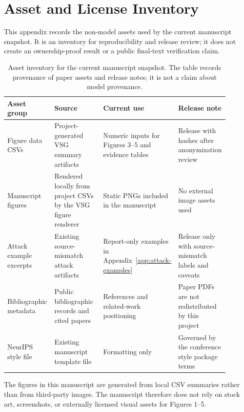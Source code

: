\section{Asset and License Inventory}
\label{app:asset-licenses}

This appendix records the non-model assets used by the current manuscript
snapshot.  It is an inventory for reproducibility and release review; it does
not create an ownership-proof result or a public final-text verification
claim.

\begin{table}[t]
\centering
\scriptsize
\setlength{\tabcolsep}{3pt}
\renewcommand{\arraystretch}{1.12}
\begin{tabular}{p{0.22\linewidth}p{0.27\linewidth}p{0.20\linewidth}p{0.21\linewidth}}
\toprule
Asset group & Source & Current use & Release note \\
\midrule
Figure data CSVs & Project-generated VSG summary artifacts & Numeric inputs for Figures 3--5 and evidence tables & Release with hashes after anonymization review \\
Manuscript figures & Rendered locally from project CSVs by the VSG figure renderer & Static PNGs included in the manuscript & No external image assets used \\
Attack example excerpts & Existing source-mismatch attack artifacts & Report-only examples in Appendix~\ref{app:attack-examples} & Release only with source-mismatch labels and caveats \\
Bibliographic metadata & Public bibliographic records and cited papers & References and related-work positioning & Paper PDFs are not redistributed by this project \\
NeurIPS style file & Existing manuscript template file & Formatting only & Governed by the conference style package terms \\
\bottomrule
\end{tabular}
\caption{Asset inventory for the current manuscript snapshot.  The table
records provenance of paper assets and release notes; it is not a claim about
model provenance.}
\label{tab:asset-license-inventory}
\end{table}

The figures in this manuscript are generated from local CSV summaries rather
than from third-party images.  The manuscript therefore does not rely on stock
art, screenshots, or externally licensed visual assets for Figures 1--5.
